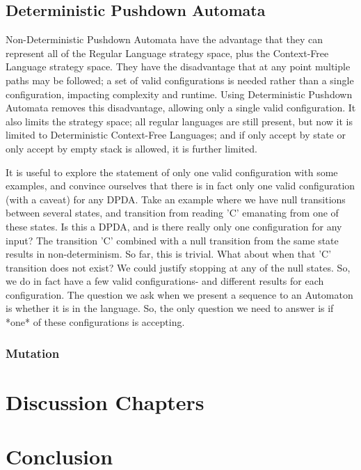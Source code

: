 \documentclass[a4paper,11pt,bcshonoursthesis,singlespace,twoside]{cssethesis}
\begin{document}
\section{Deterministic Pushdown Automata}
Non-Deterministic Pushdown Automata have the advantage that they can represent all of the Regular Language strategy space, plus the Context-Free Language strategy space. They have the disadvantage that at any point multiple paths may be followed; a set of valid configurations is needed rather than a single configuration, impacting complexity and runtime. Using Deterministic Pushdown Automata removes this disadvantage, allowing only a single valid configuration. 
It also limits the strategy space; all regular languages are still present, but now it is limited to Deterministic Context-Free Languages; and if only accept by state or only accept by empty stack is allowed, it is further limited. 

It is useful to explore the statement of only one valid configuration with some examples, and convince ourselves that there is in fact only one valid configuration (with a caveat) for any DPDA. 
Take an example where we have null transitions between several states, and transition from reading 'C' emanating from one of these states. 
Is this a DPDA, and is there really only one configuration for any input? 
The transition 'C' combined with a null transition from the same state results in non-determinism. 
So far, this is trivial. What about when that 'C' transition does not exist? 
We could justify stopping at any of the null states. 
So, we do in fact have a few valid configurations- and different results for each configuration. 
The question we ask when we present a sequence to an Automaton is whether it is in the language. 
So, the only question we need to answer is if *one* of these configurations is accepting. 
\subsection{Mutation}
\chapter{Discussion Chapters}

\chapter{Conclusion}

\appendix %
\end{document}
